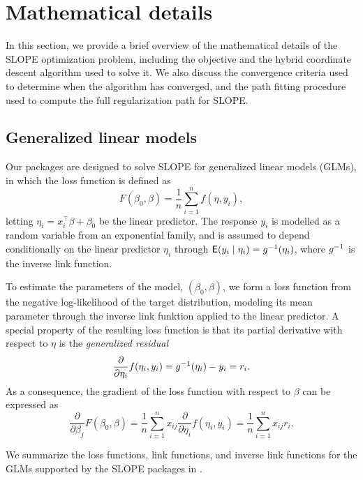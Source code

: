 \documentclass[article]{jss}
\let\Cref\crtCref
\begin{document}
\section{Mathematical details}\label{sec:math-details}

In this section, we provide a brief overview of the mathematical
details of the SLOPE optimization problem, including the objective and
the hybrid coordinate descent algorithm used to solve it. We also discuss the
convergence criteria used to determine when the algorithm has converged, and
the path fitting procedure used to compute the full regularization path for SLOPE.

\subsection{Generalized linear models}
\label{sec:glm}

Our packages are designed to solve SLOPE for generalized linear models (GLMs),
in which the loss function is defined as
\[
  F(\beta_0, \beta) = \frac{1}{n} \sum_{i=1}^n f(\eta, y_i),
\]
letting \(\eta_i = x_i^\intercal \beta + \beta_0\) be the linear predictor. The
response \(y_i\) is modelled as a random variable from an exponential family,
and is assumed to depend conditionally on the linear predictor \(\eta_i\)
through \(\mathsf{E}(y_i \mid \eta_i) = g^{-1}(\eta_i)\), where \(g^{-1}\) is the
inverse link function.

To estimate the parameters of the model, \((\beta_0, \beta)\), we form a loss
function from the negative log-likelihood of the target distribution, modeling
its mean parameter through the inverse link funktion applied to the linear
predictor. A special property of the resulting loss function is that its partial
derivative with respect to \(\eta\) is the
\emph{generalized residual}
\[
  \frac{\partial}{\partial \eta_i} f(\eta_i, y_i) = g^{-1}(\eta_i) - y_i = r_i.
\]
As a consequence, the gradient of the loss function with respect to \(\beta\)
can be expressed as
\[
  \frac{\partial}{\partial \beta_j} F(\beta_0,\beta)
  = \frac{1}{n} \sum_{i=1}^n x_{ij} \frac{\partial}{\partial \eta_i} f(\eta_i, y_i)
  = \frac{1}{n} \sum_{i=1}^n x_{ij} r_i.
\]

We summarize the loss functions, link functions, and inverse link functions
for the GLMs supported by the SLOPE packages in \Cref{tab:glm}.
\end{document}
